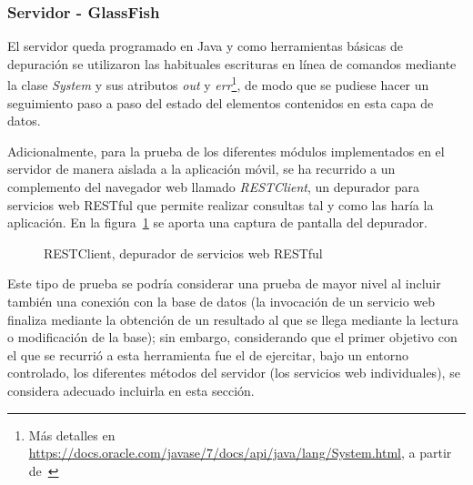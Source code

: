 \subsubsection{Servidor - GlassFish}

El servidor queda programado en Java y como herramientas básicas de depuración se utilizaron las habituales escrituras en línea de comandos mediante la clase \emph{System} y sus atributos \emph{out} y \emph{err}\footnote{Más detalles en \url{https://docs.oracle.com/javase/7/docs/api/java/lang/System.html}, a partir de~\cite{DocOr}}, de modo que se pudiese hacer un seguimiento paso a paso del estado del elementos contenidos en esta capa de datos.

Adicionalmente, para la prueba de los diferentes módulos implementados en el servidor de manera aislada a la aplicación móvil, se ha recurrido a un complemento del navegador web llamado \emph{RESTClient}, un depurador para servicios web RESTful que permite realizar consultas tal y como las haría la aplicación. En la figura~\ref{fig:RESTClient} se aporta una captura de pantalla del depurador.

\begin{figure}
	\centering
	\caption{RESTClient, depurador de servicios web RESTful}
	\label{fig:RESTClient}
\end{figure}

Este tipo de prueba se podría considerar una prueba de mayor nivel al incluir también una conexión con la base de datos (la invocación de un servicio web finaliza mediante la obtención de un resultado al que se llega mediante la lectura o modificación de la base); sin embargo, considerando que el primer objetivo con el que se recurrió a esta herramienta fue el de ejercitar, bajo un entorno controlado, los diferentes métodos del servidor (los servicios web individuales), se considera adecuado incluirla en esta sección.

